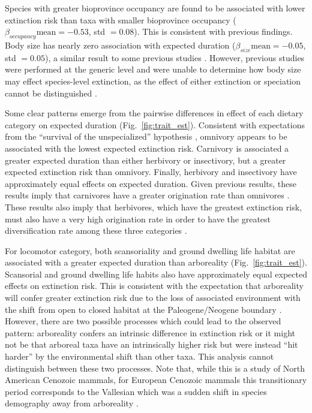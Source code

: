 Species with greater bioprovince occupancy are found to be associated with lower extinction risk than taxa with smaller bioprovince occupancy (\(\beta_{occupancy} \text{mean} = -0.53\), std \(= 0.08\)). This is consistent with previous findings. Body size has nearly zero association with expected duration (\(\beta_{size} \text{mean} = -0.05\), std \(= 0.05\)), a similar result to some previous studies \cite{Tomiya2013}. However, previous studies were performed at the generic level and were unable to determine how body size may effect species-level extinction, as the effect of either extinction or speciation cannot be distinguished \cite{Liow2008,Tomiya2013}.

Some clear patterns emerge from the pairwise differences in effect of each dietary category on expected duration (Fig.~\ref{fig:trait_est}). Consistent with expectations from the ``survival of the unspecialized'' hypothesis \cite{Liow2004a,Simpson1944}, omnivory appears to be associated with the lowest expected extinction risk. Carnivory is associated a greater expected duration than either herbivory or insectivory, but a greater expected extinction risk than omnivory. Finally, herbivory and insectivory have approximately equal effects on expected duration. Given previous results, these results imply that carnivores have a greater origination rate than omnivores \cite{Price2012}. These results also imply that herbivores, which have the greatest extinction risk, must also have a very high origination rate in order to have the greatest diversification rate among these three categories \cite{Price2012}. 

For locomotor category, both scansoriality and ground dwelling life habitat are associated with a greater expected duration than arboreality (Fig.~\ref{fig:trait_est}). Scansorial and ground dwelling life habits also have approximately equal expected effects on extinction risk.  This is consistent with the expectation that arboreality will confer greater extinction risk due to the loss of associated environment with the shift from open to closed habitat at the Paleogene/Neogene boundary \cite{Blois2009}. However, there are two possible processes which could lead to the observed pattern: arboreality confers an intrinsic difference in extinction risk or it might not be that arboreal taxa have an intrinsically higher risk but were instead ``hit harder'' by the environmental shift than other taxa. This analysis cannot distinguish between these two processes. Note that, while this is a study of North American Cenozoic mammals, for European Cenozoic mammals this transitionary period corresponds to the Vallesian which was a sudden shift in species demography away from arboreality \cite{Agusti2013,Moya-Sola2005}.

